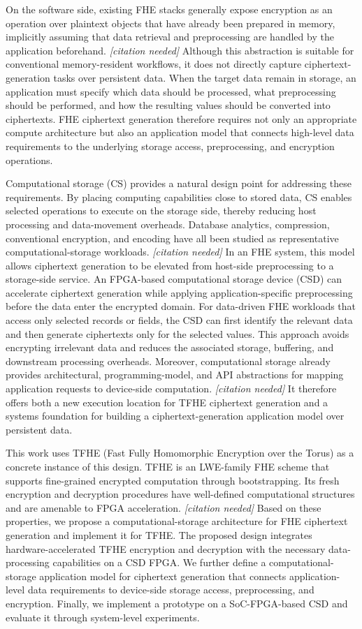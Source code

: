 \documentclass[sigconf,anonymous]{acmart}
\newcommand{\citationneeded}{\textit{[citation needed]}}
\begin{document}
On the software side, existing FHE stacks generally expose encryption as an operation over plaintext objects that have already been prepared in memory, implicitly assuming that data retrieval and preprocessing are handled by the application beforehand. \citationneeded{} Although this abstraction is suitable for conventional memory-resident workflows, it does not directly capture ciphertext-generation tasks over persistent data. When the target data remain in storage, an application must specify which data should be processed, what preprocessing should be performed, and how the resulting values should be converted into ciphertexts. FHE ciphertext generation therefore requires not only an appropriate compute architecture but also an application model that connects high-level data requirements to the underlying storage access, preprocessing, and encryption operations.

Computational storage (CS) provides a natural design point for addressing these requirements. By placing computing capabilities close to stored data, CS enables selected operations to execute on the storage side, thereby reducing host processing and data-movement overheads. Database analytics, compression, conventional encryption, and encoding have all been studied as representative computational-storage workloads. \citationneeded{} In an FHE system, this model allows ciphertext generation to be elevated from host-side preprocessing to a storage-side service. An FPGA-based computational storage device (CSD) can accelerate ciphertext generation while applying application-specific preprocessing before the data enter the encrypted domain. For data-driven FHE workloads that access only selected records or fields, the CSD can first identify the relevant data and then generate ciphertexts only for the selected values. This approach avoids encrypting irrelevant data and reduces the associated storage, buffering, and downstream processing overheads. Moreover, computational storage already provides architectural, programming-model, and API abstractions for mapping application requests to device-side computation. \citationneeded{} It therefore offers both a new execution location for TFHE ciphertext generation and a systems foundation for building a ciphertext-generation application model over persistent data.

This work uses TFHE (Fast Fully Homomorphic Encryption over the Torus) as a concrete instance of this design. TFHE is an LWE-family FHE scheme that supports fine-grained encrypted computation through bootstrapping. Its fresh encryption and decryption procedures have well-defined computational structures and are amenable to FPGA acceleration. \citationneeded{} Based on these properties, we propose a computational-storage architecture for FHE ciphertext generation and implement it for TFHE. The proposed design integrates hardware-accelerated TFHE encryption and decryption with the necessary data-processing capabilities on a CSD FPGA. We further define a computational-storage application model for ciphertext generation that connects application-level data requirements to device-side storage access, preprocessing, and encryption. Finally, we implement a prototype on a SoC-FPGA-based CSD and evaluate it through system-level experiments.
\end{document}
